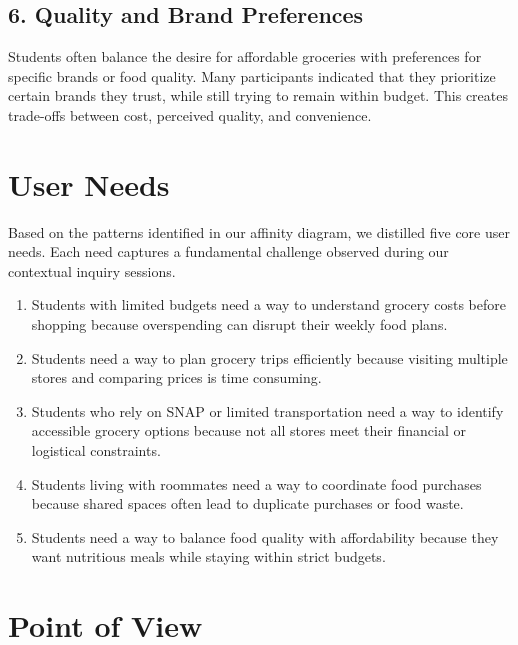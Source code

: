 \documentclass[11pt]{article}
\begin{document}
\subsection*{6. Quality and Brand Preferences}
Students often balance the desire for affordable groceries with preferences for specific brands or food quality. Many participants indicated that they prioritize certain brands they trust, while still trying to remain within budget. This creates trade-offs between cost, perceived quality, and convenience.

\newpage

\section*{User Needs}

Based on the patterns identified in our affinity diagram, we distilled five core user needs. Each need captures a fundamental challenge observed during our contextual inquiry sessions.

\begin{enumerate}

\item Students with limited budgets need a way to understand grocery costs before shopping because overspending can disrupt their weekly food plans.

\item Students need a way to plan grocery trips efficiently because visiting multiple stores and comparing prices is time consuming.

\item Students who rely on SNAP or limited transportation need a way to identify accessible grocery options because not all stores meet their financial or logistical constraints.

\item Students living with roommates need a way to coordinate food purchases because shared spaces often lead to duplicate purchases or food waste.

\item Students need a way to balance food quality with affordability because they want nutritious meals while staying within strict budgets.

\end{enumerate}

\section*{Point of View}
\end{document}
